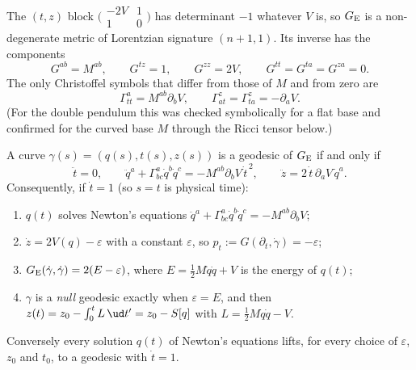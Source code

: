 The $(t,z)$ block $\bigl(\begin{smallmatrix}-2V&1\\1&0\end{smallmatrix}\bigr)$
has determinant $-1$ whatever $V$ is, so $G_{\rm E}$ is a non-degenerate metric
of Lorentzian signature $(n{+}1,1)$. Its inverse has the components
\begin{equation}\label{eq:hz-eis-inverse}
  G^{ab}=M^{ab},\qquad G^{tz}=1,\qquad G^{zz}=2V,\qquad G^{tt}=G^{ta}=G^{za}=0 .
\end{equation}
The only Christoffel symbols that differ from those of $M$ and from zero are
\begin{equation}\label{eq:hz-eis-christoffel}
  \Gamma^a_{tt}=M^{ab}\partial_bV,\qquad
  \Gamma^z_{at}=\Gamma^z_{ta}=-\partial_aV .
\end{equation}
(For the double pendulum this was checked symbolically for a flat base and
confirmed for the curved base $M$ through the Ricci tensor below.)

\begin{theorem}[Eisenhart]\label{thm:hz-eis}
A curve $\gamma(s)=(q(s),t(s),z(s))$ is a geodesic of $G_{\rm E}$ if and only if
\begin{equation}\label{eq:hz-eis-geod}
  \ddot t=0,\qquad
  \ddot q^a+\Gamma^a_{bc}\dot q^b\dot q^c=-M^{ab}\partial_bV\,\dot t^{\,2},\qquad
  \ddot z=2\,\dot t\,\partial_aV\,\dot q^a .
\end{equation}
Consequently, if $\dot t=1$ (so $s=t$ is physical time):
\begin{enumerate}[label=(\alph*),nosep]
  \item $q(t)$ solves Newton's equations $\ddot q^a+\Gamma^a_{bc}\dot q^b\dot q^c=-M^{ab}\partial_bV$;
  \item $\dot z=2V(q)-\varepsilon$ with a constant $\varepsilon$, so $p_t:=G(\partial_t,\dot\gamma)=-\varepsilon$;
  \item $G_{\rm E}(\dot\gamma,\dot\gamma)=2(E-\varepsilon)$, where $E=\tfrac12M\dot q\dot q+V$ is the energy of $q(t)$;
  \item $\gamma$ is a \emph{null} geodesic exactly when $\varepsilon=E$, and then
        $z(t)=z_0-\int_0^t L\,\ud t'=z_0-S[q]$ with $L=\tfrac12M\dot q\dot q-V$.
\end{enumerate}
Conversely every solution $q(t)$ of Newton's equations lifts, for every
choice of $\varepsilon$, $z_0$ and $t_0$, to a geodesic with $\dot t=1$.
\end{theorem}

